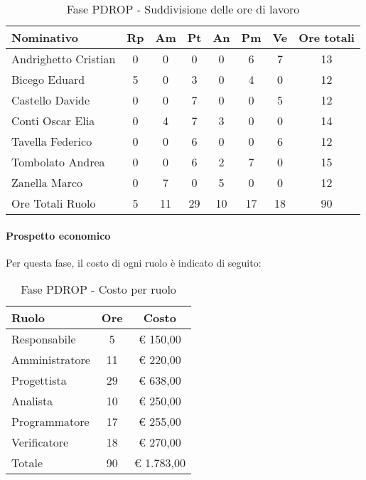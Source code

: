 \documentclass[../PianoProgetto.tex]{subfiles}
\begin{document}
					\begin{table}[h]
		\centering
	
		\begin{tabular}{l * {7}{c}}
			\toprule
			Nominativo & Rp & Am & Pt & An & Pm & Ve & Ore totali \\
			\midrule
			Andrighetto Cristian & 0 & 0 & 0 & 0 & 6 & 7 & 13 \\
			\midrule
			Bicego Eduard & 5 & 0 &	3 &	0 &	4 &	0 &	12 \\
			\midrule
			Castello Davide & 0 & 0 & 7 & 0 & 0 & 5 & 12 \\
			\midrule
			Conti Oscar Elia &0 & 4 & 7 & 3 & 0 & 0 & 14 \\
			\midrule
			Tavella Federico &	0 & 0 & 6 & 0 & 0 & 6 & 12 \\
			\midrule
			Tombolato Andrea & 0 & 0 & 6 & 2 & 7 & 0 & 15 \\
			\midrule
			Zanella Marco & 0 & 7 & 0 & 5 & 0 & 0 & 12 \\
			\midrule			
			Ore Totali Ruolo & 5 & 11 & 29 & 10 & 17 & 18 & 90 \\
			\bottomrule
			
		\end{tabular}
		
		\caption{Fase PDROP - Suddivisione delle ore di lavoro}
		\label{tab:fasePDROP_ore}
		
	\end{table}
	
	\paragraph{Prospetto economico}
					Per questa fase, il costo di ogni ruolo è indicato di seguito:
					\begin{table}[h]
		\centering
	
		\begin{tabular}{l * {2}{c}}
			\toprule
			Ruolo & Ore & Costo \\
			\midrule
			Responsabile &	5 & \euro{} 150,00 \\
			\midrule
			Amministratore & 11 & \euro{} 220,00 \\
			\midrule
			Progettista & 29 & \euro{} 638,00 \\
			\midrule
			Analista & 10 & \euro{} 250,00 \\
			\midrule
			Programmatore & 17 & \euro{} 255,00 \\
			\midrule
			Verificatore & 18 & \euro{} 270,00 \\
			\midrule		
			Totale & 90 & \euro{} 1.783,00 \\
			\bottomrule
			
		\end{tabular}
		
		\caption{Fase PDROP - Costo per ruolo}
		\label{tab:fasePDROP_costo}
		
	\end{table}
	
\end{document}

